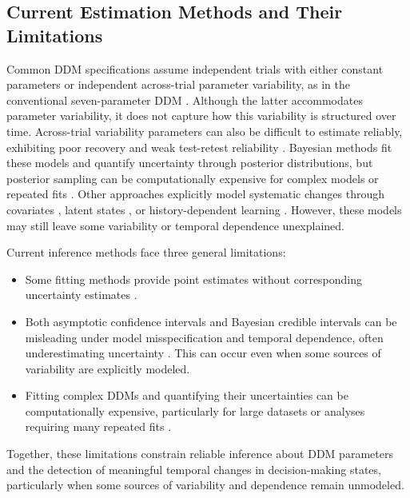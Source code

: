 \documentclass[00-main.tex]{subfiles}
\begin{document}
\subsection{Current Estimation Methods and Their Limitations}
Common DDM specifications assume independent trials with either constant parameters or independent across-trial parameter variability, as in the conventional seven-parameter DDM \citep{ratcliff_modeling_1998, ratcliff_parameter_2013}. Although the latter accommodates parameter variability, it does not capture how this variability is structured over time. Across-trial variability parameters can also be difficult to estimate reliably, exhibiting poor recovery and weak test-retest reliability \citep{boehm_estimating_2018, lerche_model_2016, ratcliff_individual_2015, ratcliff_internal_2018}. Bayesian methods fit these models and quantify uncertainty through posterior distributions, but posterior sampling can be computationally expensive for complex models or repeated fits \citep{wiecki_hddm_2013, fengler_hssm_2026}. Other approaches explicitly model systematic changes through covariates \citep{cochrane_multiple_2023, alister_diffusion_2026}, latent states \citep{gunawan_time-evolving_2022, kucharsky_hidden_2021}, or history-dependent learning \citep{miletic_explaining_2025, pedersen_drift_2017, fontanesi_reinforcement_2019}. However, these models may still leave some variability or temporal dependence unexplained.

Current inference methods face three general limitations:
\begin{itemize}
    \item Some fitting methods provide point estimates without corresponding uncertainty estimates \citep{shinn_flexible_2020, boehm_estimating_2018}.
    \item Both asymptotic confidence intervals and Bayesian credible intervals can be misleading under model misspecification and temporal dependence, often underestimating uncertainty \citep{white_maximum_1982, shaby_open-faced_2014, newey_simple_1987}. This can occur even when some sources of variability are explicitly modeled.
    \item Fitting complex DDMs and quantifying their uncertainties can be computationally expensive, particularly for large datasets or analyses requiring many repeated fits \citep{boehm_estimating_2018, moens_recurrent_2018, wiecki_hddm_2013, fengler_hssm_2026}.
\end{itemize}

Together, these limitations constrain reliable inference about DDM parameters and the detection of meaningful temporal changes in decision-making states, particularly when some sources of variability and dependence remain unmodeled.
\end{document}
